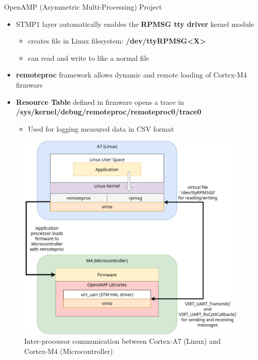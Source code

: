 \documentclass[8pt,compress,aspectratio=169]{beamer}
\newcommand\LightBold[1]{\textcolor{VSBlueLight}{\textbf{#1}}}
\newcommand\DarkBoldP[1]{\textcolor{VSPurpleDark}{\textbf{#1}}}
\begin{document}
\begin{frame}
\begin{minipage}{0.465\textwidth}
\begin{block}{OpenAMP (Asymmetric Multi-Processing) Project}
\begin{itemize}
        \item STMP1 layer automatically enables the \DarkBoldP{RPMSG tty driver} kernel module
          \begin{itemize}
              \tiny
            \item creates file in Linux filesystem: \DarkBoldP{/dev/ttyRPMSG<X>}
            \item can read and write to like a normal file
          \end{itemize}
        \item \DarkBoldP{remoteproc} framework allows dynamic and remote loading of Cortex-M4 firmware
        \item \LightBold{Resource Table} defined in firmware opens a trace in\\
          {\scriptsize\DarkBoldP{/sys/kernel/debug/remoteproc/remoteproc0/trace0}}
          \begin{itemize}
              \tiny
            \item Used for logging measured data in CSV format
          \end{itemize}
      \end{itemize}
    \end{block}
  \end{minipage}
  \hfill
  \begin{minipage}{0.465\textwidth}
    \begin{figure}
      \includegraphics[width=\textwidth]{assets/diagrams/ipc.drawio.png}
      \caption{Inter-processor communication between Cortex-A7 (Linux) and Cortex-M4 (Microcontroller)}
    \end{figure}
  \end{minipage}
\end{frame}
\end{document}
